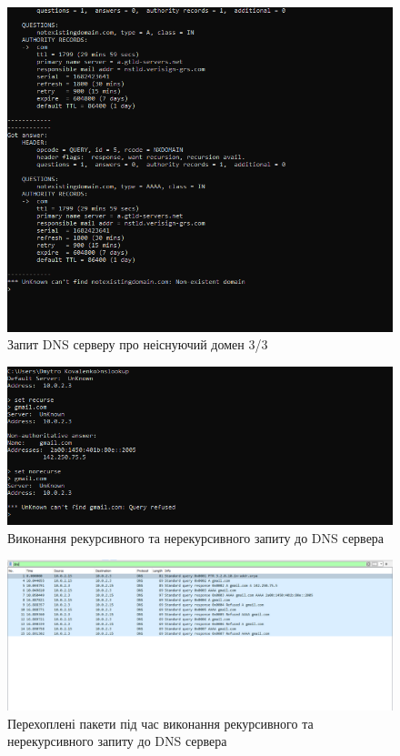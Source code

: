 \documentclass{article}
\begin{document}
\begin{normalsize}
\begin{figure}[H]
	\includegraphics[width=\textwidth]{53}
	\caption{Запит DNS серверу про неіснуючий домен 3/3}
\end{figure}
\begin{figure}[H]
	\centering
	\includegraphics[width=\textwidth]{62}
	\caption{Виконання рекурсивного та нерекурсивного запиту до DNS сервера}
\end{figure}
\begin{figure}[H]
	\centering
	\includegraphics[width=\textwidth]{61}
	\caption{Перехоплені пакети під час виконання рекурсивного та нерекурсивного запиту до DNS сервера}

\end{figure}
\end{normalsize}
\end{document}
